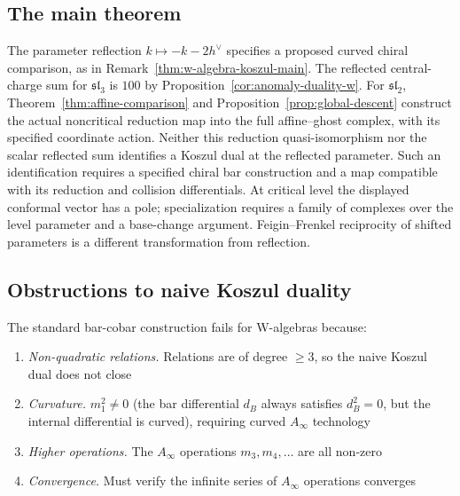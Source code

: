 \subsection{The main theorem}

\begin{remark}\label{thm:w-koszul-precise}
The parameter reflection $k\mapsto-k-2h^\vee$ specifies a proposed curved chiral comparison, as in Remark~\ref{thm:w-algebra-koszul-main}.
The reflected central-charge sum for $\mathfrak{sl}_3$ is $100$ by Proposition~\ref{cor:anomaly-duality-w}.
For $\mathfrak{sl}_2$, Theorem~\ref{thm:affine-comparison} and Proposition~\ref{prop:global-descent} construct the actual noncritical reduction map into the full affine--ghost complex, with its specified coordinate action.
Neither this reduction quasi-isomorphism nor the scalar reflected sum identifies a Koszul dual at the reflected parameter.
Such an identification requires a specified chiral bar construction and a map compatible with its reduction and collision differentials.
At critical level the displayed conformal vector has a pole; specialization requires a family of complexes over the level parameter and a base-change argument.
Feigin--Frenkel reciprocity of shifted parameters is a different transformation from reflection.
\end{remark}

\subsection{Obstructions to naive Koszul duality}

\begin{remark}
The standard bar-cobar construction fails for W-algebras because:
\begin{enumerate}
\item \emph{Non-quadratic relations.} Relations are of degree $\geq 3$, so the naive Koszul dual does not close
\item \emph{Curvature.} $m_1^2 \neq 0$ (the bar differential $d_B$ always satisfies $d_B^2 = 0$, but the internal differential is curved), requiring curved $A_\infty$ technology
\item \emph{Higher operations.} The $A_\infty$ operations $m_3, m_4, \ldots$ are all non-zero
\item \emph{Convergence.} Must verify the infinite series of $A_\infty$ operations converges
\end{enumerate}
\end{remark}

